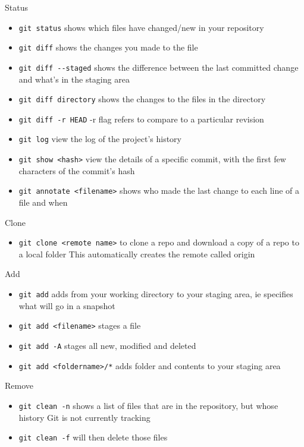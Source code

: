 \documentclass[]{book}
\providecommand{\tightlist}{%
  \setlength{\itemsep}{0pt}\setlength{\parskip}{0pt}}
\begin{document}
Status

\begin{itemize}
\tightlist
\item
  \texttt{git\ status} shows which files have changed/new in your repository
\item
  \texttt{git\ diff} shows the changes you made to the file
\item
  \texttt{git\ diff\ -\/-staged} shows the difference between the last committed change and what's in the staging area
\item
  \texttt{git\ diff\ directory} shows the changes to the files in the directory
\item
  \texttt{git\ diff\ -r\ HEAD} -r flag refers to compare to a particular revision
\item
  \texttt{git\ log} view the log of the project's history
\item
  \texttt{git\ show\ \textless{}hash\textgreater{}} view the details of a specific commit, with the first few characters of the commit's hash
\item
  \texttt{git\ annotate\ \textless{}filename\textgreater{}} shows who made the last change to each line of a file and when
\end{itemize}

Clone

\begin{itemize}
\tightlist
\item
  \texttt{git\ clone\ \textless{}remote\ name\textgreater{}} to clone a repo and download a copy of a repo to a local folder This automatically creates the remote called origin
\end{itemize}

Add

\begin{itemize}
\tightlist
\item
  \texttt{git\ add} adds from your working directory to your staging area, ie specifies what will go in a snapshot
\item
  \texttt{git\ add\ \textless{}filename\textgreater{}} stages a file
\item
  \texttt{git\ add\ -A} stages all new, modified and deleted
\item
  \texttt{git\ add\ \textless{}foldername\textgreater{}/*} adds folder and contents to your staging area
\end{itemize}

Remove

\begin{itemize}
\tightlist
\item
  \texttt{git\ clean\ -n} shows a list of files that are in the repository, but whose history Git is not currently tracking
\item
  \texttt{git\ clean\ -f} will then delete those files
\end{itemize}
\end{document}
